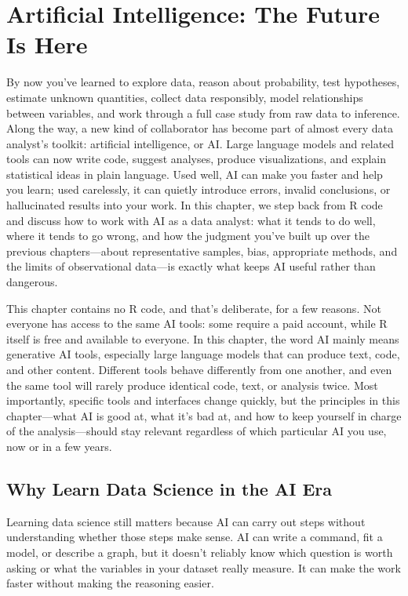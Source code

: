 \chapter{Artificial Intelligence: The Future Is Here}
\label{ch:ai}

By now you've learned to explore data, reason about probability,
test hypotheses, estimate unknown quantities, collect data responsibly,
model relationships between variables, and work through a full case
study from raw data to inference. Along the way, a new kind of
collaborator has become part of almost every data analyst's toolkit:
artificial intelligence, or AI. Large language
models and related tools
can now write code, suggest analyses, produce visualizations, and
explain statistical ideas in plain language. Used well, AI can make you
faster and help you learn; used carelessly, it can quietly introduce
errors, invalid conclusions, or hallucinated results into your work. In
this chapter, we step back from R code and discuss how to work with AI
as a data analyst: what it tends to do well, where it tends to go
wrong, and how the judgment you've built up over the previous
chapters---about representative samples, bias, appropriate methods,
and the limits of observational data---is exactly what keeps AI useful
rather than dangerous.

This chapter contains no R code, and that's deliberate, for a few
reasons. Not everyone has access to the same AI tools: some require a
paid account, while R itself is free and available to everyone.
In this chapter, the word AI mainly means generative AI tools,
especially large language models that can produce text, code, and
other content.
Different tools behave differently from one another, and even the
same tool will rarely produce identical code, text, or analysis twice.
Most importantly, specific tools and interfaces change quickly, but
the principles in this chapter---what AI is good at, what it's bad
at, and how to keep yourself in charge of the analysis---should stay
relevant regardless of which particular AI you use, now or in a few
years.

\section{Why Learn Data Science in the AI Era}

Learning data science still matters because AI can carry out steps without
understanding whether those steps make sense. AI can write a command, fit a
model, or describe a graph, but it doesn't reliably know which question is
worth asking or what the variables in your dataset really measure. It can make
the work faster without making the reasoning easier.

